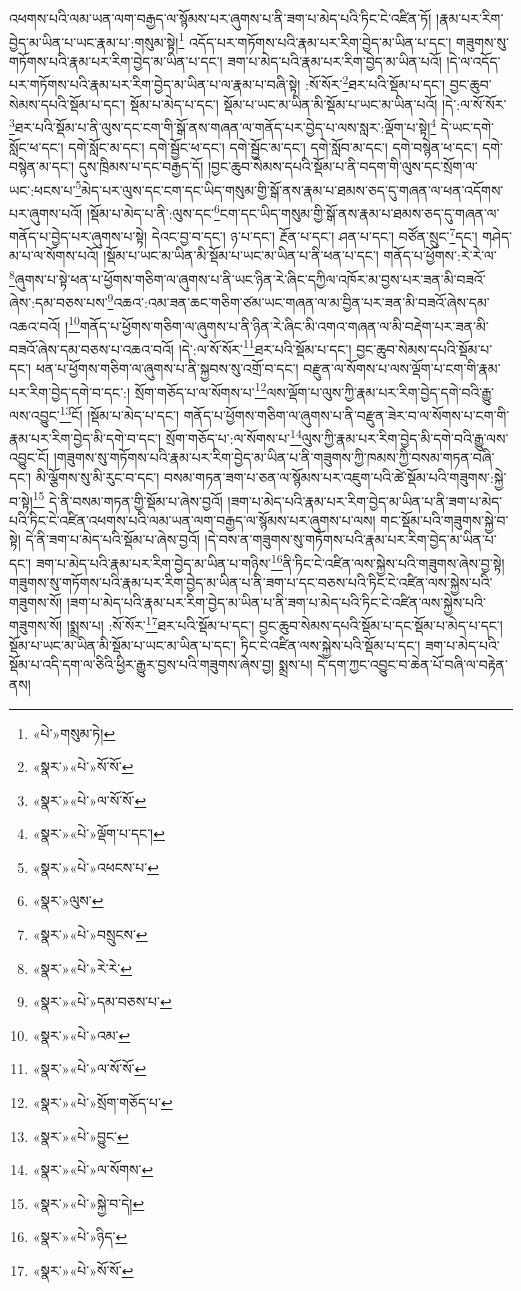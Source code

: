 འཕགས་པའི་ལམ་ཡན་ལག་བརྒྱད་ལ་སྙོམས་པར་ཞུགས་པ་ནི་ཟག་པ་མེད་པའི་ཏིང་ངེ་འཛིན་ཏོ། །རྣམ་པར་རིག་བྱེད་མ་ཡིན་པ་ཡང་རྣམ་པ་:གསུམ་སྟེ།\footnote{«པེ་»གསུམ་ཏེ།} འདོད་པར་གཏོགས་པའི་རྣམ་པར་རིག་བྱེད་མ་ཡིན་པ་དང་། གཟུགས་སུ་གཏོགས་པའི་རྣམ་པར་རིག་བྱེད་མ་ཡིན་པ་དང་། ཟག་པ་མེད་པའི་རྣམ་པར་རིག་བྱེད་མ་ཡིན་པའོ། །དེ་ལ་འདོད་པར་གཏོགས་པའི་རྣམ་པར་རིག་བྱེད་མ་ཡིན་པ་ལ་རྣམ་པ་བཞི་སྟེ། :སོ་སོར་\footnote{«སྣར་»«པེ་»སོ་སོ་}ཐར་པའི་སྡོམ་པ་དང་། བྱང་ཆུབ་སེམས་དཔའི་སྡོམ་པ་དང་། སྡོམ་པ་མེད་པ་དང་། སྡོམ་པ་ཡང་མ་ཡིན་མི་སྡོམ་པ་ཡང་མ་ཡིན་པའོ། །དེ་:ལ་སོ་སོར་\footnote{«སྣར་»«པེ་»ལ་སོ་སོ་}ཐར་པའི་སྡོམ་པ་ནི་ལུས་དང་ངག་གི་སྒོ་ནས་གཞན་ལ་གནོད་པར་བྱེད་པ་ལས་སླར་:ལྡོག་པ་སྟེ།\footnote{«སྣར་»«པེ་»ལྡོག་པ་དང་།} དེ་ཡང་དགེ་སློང་ཕ་དང་། དགེ་སློང་མ་དང་། དགེ་སྦྱོང་ཕ་དང་། དགེ་སྦྱོང་མ་དང་། དགེ་སློབ་མ་དང་། དགེ་བསྙེན་ཕ་དང་། དགེ་བསྙེན་མ་དང་། དུས་ཁྲིམས་པ་དང་བརྒྱད་དོ། །བྱང་ཆུབ་སེམས་དཔའི་སྡོམ་པ་ནི་བདག་གི་ལུས་དང་སྲོག་ལ་ཡང་:ཕངས་པ་\footnote{«སྣར་»«པེ་»འཕངས་པ་}མེད་པར་ལུས་དང་ངག་དང་ཡིད་གསུམ་གྱི་སྒོ་ནས་རྣམ་པ་ཐམས་ཅད་དུ་གཞན་ལ་ཕན་འདོགས་པར་ཞུགས་པའོ། །སྡོམ་པ་མེད་པ་ནི་:ལུས་དང་\footnote{«སྣར་»ལུས་}ངག་དང་ཡིད་གསུམ་གྱི་སྒོ་ནས་རྣམ་པ་ཐམས་ཅད་དུ་གཞན་ལ་གནོད་པ་བྱེད་པར་ཞུགས་པ་སྟེ། དེའང་བྱ་བ་དང་། ཉ་པ་དང་། རྔོན་པ་དང་། ཤན་པ་དང་། བཙོན་སྲུང་\footnote{«སྣར་»«པེ་»བསྲུངས་}དང་། གཤེད་མ་པ་ལ་སོགས་པའོ། །སྡོམ་པ་ཡང་མ་ཡིན་མི་སྡོམ་པ་ཡང་མ་ཡིན་པ་ནི་ཕན་པ་དང་། གནོད་པ་ཕྱོགས་:རེ་རེ་ལ་\footnote{«སྣར་»«པེ་»རེ་རེ་}ཞུགས་པ་སྟེ་ཕན་པ་ཕྱོགས་གཅིག་ལ་ཞུགས་པ་ནི་ཡང་ཉིན་རེ་ཞིང་དཀྱིལ་འཁོར་མ་བྱས་པར་ཟན་མི་བཟའོ་ཞེས་:དམ་བཅས་པས་\footnote{«སྣར་»«པེ་»དམ་བཅས་པ་}འཆའ་:འམ་ཟན་ཆང་གཅིག་ཙམ་ཡང་གཞན་ལ་མ་བྱིན་པར་ཟན་མི་བཟའོ་ཞེས་དམ་འཆའ་བའོ། །\footnote{«སྣར་»«པེ་»འམ་}གནོད་པ་ཕྱོགས་གཅིག་ལ་ཞུགས་པ་ནི་ཉིན་རེ་ཞིང་མི་འགའ་གཞན་ལ་མི་བརྡེག་པར་ཟན་མི་བཟའོ་ཞེས་དམ་བཅས་པ་འཆའ་བའོ། །དེ་:ལ་སོ་སོར་\footnote{«སྣར་»«པེ་»ལ་སོ་སོ་}ཐར་པའི་སྡོམ་པ་དང་། བྱང་ཆུབ་སེམས་དཔའི་སྡོམ་པ་དང་། ཕན་པ་ཕྱོགས་གཅིག་ལ་ཞུགས་པ་ནི་སྐྱབས་སུ་འགྲོ་བ་དང་། བརྫུན་ལ་སོགས་པ་ལས་ལྡོག་པ་ངག་གི་རྣམ་པར་རིག་བྱེད་དགེ་བ་དང་:། སྲོག་གཅོད་པ་ལ་སོགས་པ་\footnote{«སྣར་»«པེ་»སྲོག་གཅོད་པ་}ལས་ལྡོག་པ་ལུས་ཀྱི་རྣམ་པར་རིག་བྱེད་དགེ་བའི་རྒྱུ་ལས་འབྱུང་\footnote{«སྣར་»«པེ་»བྱུང་}ངོ། །སྡོམ་པ་མེད་པ་དང་། གནོད་པ་ཕྱོགས་གཅིག་ལ་ཞུགས་པ་ནི་བརྫུན་ཟེར་བ་ལ་སོགས་པ་ངག་གི་རྣམ་པར་རིག་བྱེད་མི་དགེ་བ་དང་། སྲོག་གཅོད་པ་:ལ་སོགས་པ་\footnote{«སྣར་»«པེ་»ལ་སོགས་}ལུས་ཀྱི་རྣམ་པར་རིག་བྱེད་མི་དགེ་བའི་རྒྱུ་ལས་འབྱུང་ངོ། །གཟུགས་སུ་གཏོགས་པའི་རྣམ་པར་རིག་བྱེད་མ་ཡིན་པ་ནི་གཟུགས་ཀྱི་ཁམས་ཀྱི་བསམ་གཏན་བཞི་དང་། མི་ལྕོགས་སུ་མི་རུང་བ་དང་། བསམ་གཏན་ཟག་པ་ཅན་ལ་སྙོམས་པར་འཇུག་པའི་ཚེ་སྡོམ་པའི་གཟུགས་:སྐྱེ་བ་སྟེ།\footnote{«སྣར་»«པེ་»སྐྱེ་བ་དེ།} དེ་ནི་བསམ་གཏན་གྱི་སྡོམ་པ་ཞེས་བྱའོ། །ཟག་པ་མེད་པའི་རྣམ་པར་རིག་བྱེད་མ་ཡིན་པ་ནི་ཟག་པ་མེད་པའི་ཏིང་ངེ་འཛིན་འཕགས་པའི་ལམ་ཡན་ལག་བརྒྱད་ལ་སྙོམས་པར་ཞུགས་པ་ལས། གང་སྡོམ་པའི་གཟུགས་སྐྱེ་བ་སྟེ། དེ་ནི་ཟག་པ་མེད་པའི་སྡོམ་པ་ཞེས་བྱའོ། །དེ་བས་ན་གཟུགས་སུ་གཏོགས་པའི་རྣམ་པར་རིག་བྱེད་མ་ཡིན་པ་དང་། ཟག་པ་མེད་པའི་རྣམ་པར་རིག་བྱེད་མ་ཡིན་པ་གཉིས་\footnote{«སྣར་»«པེ་»ཉིད་}ནི་ཏིང་ངེ་འཛིན་ལས་སྐྱེས་པའི་གཟུགས་ཞེས་བྱ་སྟེ། གཟུགས་སུ་གཏོགས་པའི་རྣམ་པར་རིག་བྱེད་མ་ཡིན་པ་ནི་ཟག་པ་དང་བཅས་པའི་ཏིང་ངེ་འཛིན་ལས་སྐྱེས་པའི་གཟུགས་སོ། །ཟག་པ་མེད་པའི་རྣམ་པར་རིག་བྱེད་མ་ཡིན་པ་ནི་ཟག་པ་མེད་པའི་ཏིང་ངེ་འཛིན་ལས་སྐྱེས་པའི་གཟུགས་སོ། །སྨྲས་པ། :སོ་སོར་\footnote{«སྣར་»«པེ་»སོ་སོ་}ཐར་པའི་སྡོམ་པ་དང་། བྱང་ཆུབ་སེམས་དཔའི་སྡོམ་པ་དང་སྡོམ་པ་མེད་པ་དང་། སྡོམ་པ་ཡང་མ་ཡིན་མི་སྡོམ་པ་ཡང་མ་ཡིན་པ་དང་། ཏིང་ངེ་འཛིན་ལས་སྐྱེས་པའི་སྡོམ་པ་དང་། ཟག་པ་མེད་པའི་སྡོམ་པ་འདི་དག་ལ་ཅིའི་ཕྱིར་རྒྱུར་བྱས་པའི་གཟུགས་ཞེས་བྱ། སྨྲས་པ། དེ་དག་ཀྱང་འབྱུང་བ་ཆེན་པོ་བཞི་ལ་བརྟེན་ནས། 